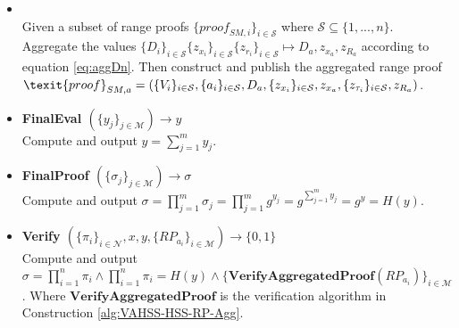 \begin{algorithm}
\begin{itemize}
\item {} \\
Given a subset of range proofs  $\{ \textit{proof}_{SM,i}\}_{i\in\mathcal{S}}$ where $\mathcal{S}\subseteq \{1,...,n\}$. Aggregate the values $\{D_i \}_{i\in\mathcal{S} } \{ z_{x_i}\}_{i\in\mathcal{S} } \{ z_{r_i}\}_{i\in\mathcal{S} } \mapsto D_a,z_{x_a},z_{R_a}$ according to equation \eqref{eq:aggDn}. Then construct and publish the aggregated range proof $\texit{proof}_{SM,a} = (\{V_i\}_{i\in\mathcal{S} },\{a_i\}_{i\in\mathcal{S} },D_a,\{z_{x_i}\}_{i\in\mathcal{S} }, z_{x_a}, \{z_{\tau_i}\}_{i\in\mathcal{S} },z_{R_a})$.


\item\textbf{FinalEval $(\{y_j\}_{j\in\mathcal{M}})\xrightarrow[]{}y$}\\
Compute and output $y = \sum_{j=1}^m y_{j}$.

\item\textbf{FinalProof $(\{\sigma_j\}_{j\in\mathcal{M}})\xrightarrow[]{}\sigma$}\\
Compute and output $\sigma = \prod_{j=1}^m \sigma_j = \prod_{j=1}^m g^{y_{j}} =  g^{\sum_{j=1}^m y_{j}}= g^{y}=H(y)$.

\item\textbf{Verify $(\{\pi_i\}_{i\in\mathcal{N}},x,y,\{RP_{a_i}\}_{i\in\mathcal{M}})\xrightarrow[]{}\{0,1\}$}\\
Compute and output $\sigma= \prod_{i=1}^n \pi_i \wedge \prod_{i=1}^n \pi_i = H(y)\wedge \{\textbf{VerifyAggregatedProof}(RP_{a_i})\}_{i\in\mathcal{M}}$. Where $\textbf{VerifyAggregatedProof}$ is the verification algorithm in Construction \ref{alg:VAHSS-HSS-RP-Agg}.
\end{itemize}
\label{alg:VAHSS-HSS-RP-Agg}
\end{algorithm}